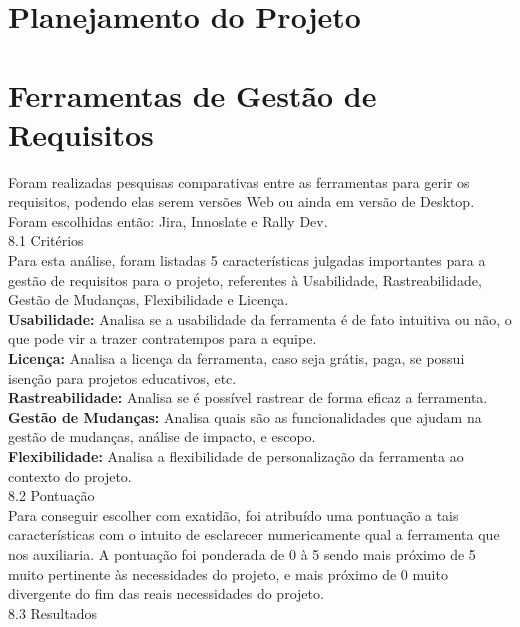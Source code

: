 \section{Planejamento do Projeto}
\label{sec:nova_sess_o}

\section{Ferramentas de Gestão de Requisitos}
\label{sec}
\tab Foram realizadas pesquisas comparativas entre as ferramentas para gerir os requisitos, podendo elas serem versões Web ou ainda em versão de Desktop. Foram escolhidas então: Jira, Innoslate e Rally Dev.\\

{\large{8.1 Critérios}}\\

\tab Para esta análise, foram listadas 5 características julgadas importantes para a gestão de requisitos para o projeto, referentes à Usabilidade, Rastreabilidade, Gestão de Mudanças, Flexibilidade e Licença.\\
\tab \textbf{Usabilidade:} Analisa se a usabilidade da ferramenta é de fato intuitiva ou não, o que pode vir a trazer contratempos para a equipe.\\
\tab \textbf{Licença:} Analisa a licença da ferramenta, caso seja grátis, paga, se possui isenção para projetos educativos, etc.\\
\tab \textbf{Rastreabilidade:} Analisa se é possível rastrear de forma eficaz a ferramenta.\\
\tab \textbf{Gestão de Mudanças:} Analisa quais são as funcionalidades que ajudam na gestão de mudanças, análise de impacto, e escopo.\\
\tab \textbf{Flexibilidade:} Analisa a flexibilidade de personalização da ferramenta ao contexto do projeto.\\

{\large{8.2 Pontuação}}\\

\tab Para conseguir escolher com exatidão, foi atribuído uma pontuação a tais características com o intuito de esclarecer numericamente qual a ferramenta que nos auxiliaria. A pontuação foi ponderada de 0 à 5 sendo mais próximo de 5 muito pertinente às necessidades do projeto, e mais próximo de 0 muito divergente do fim das reais necessidades do projeto.\\

{\large{8.3 Resultados}}\\

